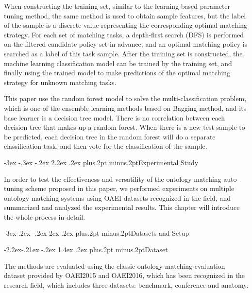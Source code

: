 \documentclass[twoside]{article}
\makeatletter
\def\section{\@startsection{section}{1}{\z@}%
 {-3ex \@plus -.3ex \@minus -.2ex}%
 {2.2ex \@plus.2ex}%
{\normalfont\normalsize\protect\baselineskip=14.5pt plus.2pt minus.2pt\bfseries}}
\def\subsection{\@startsection{subsection}{2}{\z@}%
 {-3ex\@plus -.2ex \@minus -.2ex}%
 {2ex \@plus.2ex}%
{\normalfont\normalsize\protect\baselineskip=12.5pt plus.2pt minus.2pt\bfseries}}
\def\subsubsection{\@startsection{subsubsection}{3}{\z@}%
 {-2.2ex\@plus -.21ex \@minus -.2ex}%
 {1.4ex \@plus.2ex}
{\normalfont\normalsize\protect\baselineskip=12pt plus.2pt minus.2pt\sl}}
\makeatother
\begin{document}
When constructing the training set, similar to the learning-based parameter tuning method, the same method is used to obtain sample features, but the label of the sample is a discrete value representing the corresponding optimal matching strategy.
For each set of matching tasks, a depth-first search (DFS) is performed on the filtered candidate policy set in advance, and an optimal matching policy is searched as a label of this task sample.
After the training set is constructed, the machine learning classification model can be trained by the training set, and finally using the trained model to make predictions of the optimal matching strategy for unknown matching tasks.

This paper use the random forest model to solve the multi-classification problem, which is one of the ensemble learning methods based on Bagging method, and its base learner is a decision tree model.
There is no correlation between each decision tree that makes up a random forest.
When there is a new test sample to be predicted, each decision tree in the random forest will do a separate classification task, and then vote for the classification of the sample.



\section{Experimental Study}

In order to test the effectiveness and versatility of the ontology matching auto-tuning scheme proposed in this paper, we performed experiments on multiple ontology matching systems using OAEI datasets recognized in the field, and summarized and analyzed the experimental results. This chapter will introduce the whole process in detail.

\subsection{Datasets and Setup}

\subsubsection{Dataset}
\label{sec:datasets}

The methods are evaluated using the classic ontology matching evaluation dataset provided by OAEI2015 and OAEI2016\cite{wwy58}, which has been recognized in the research field, which includes three datasets: benchmark, conference and anatomy.
\end{document}
